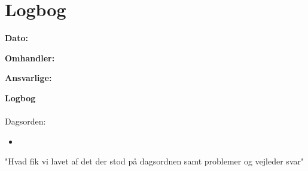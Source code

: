 \chapter{Logbog}

\textbf{Dato:} 

\textbf{Omhandler:} 

\textbf{Ansvarlige:} 

\textbf{Logbog}
\\
\\
Dagsorden:
\begin{itemize}
	\item 
\end{itemize}


"Hvad fik vi lavet af det der stod på dagsordnen samt problemer og vejleder svar"